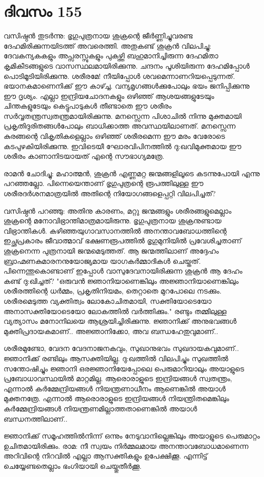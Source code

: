 \section{ദിവസം 155}


വസിഷ്ഠൻ തുടർന്നു: ഭൃഗുപുത്രനായ ശുക്രന്റെ ജീർണ്ണിച്ചുവരണ്ട ദേഹമിരിക്കുന്നയിടത്ത് അവരെത്തി. അതുകണ്ട് ശുക്രൻ വിലപിച്ചു: ദേവകന്യകകളും അപ്സരസ്സുകളും പുകഴ്ത്തി ബഹുമാനിച്ചിരുന്ന ദേഹമിതാ കൃമികീടങ്ങളുടെ വാസസ്ഥലമായിരിക്കുന്നു. ചന്ദനം പൂശിയിരുന്ന ദേഹമിപ്പോൾ പൊടിമൂടിയിരിക്കുന്നു. ശരീരമേ! നീയിപ്പോൾ ശവമെന്നാണറിയപ്പെടുന്നത്. ഭയാനകമാണെനിക്ക് ഈ കാഴ്ച്ച. വന്യമൃഗങ്ങൾക്കുപോലും ഭയം ജനിപ്പിക്കുന്നു ഈ ദൃശ്യം. എല്ലാ ഇന്ദ്രിയചോദനകളും ഒഴിഞ്ഞ് ആശയങ്ങളുടേയും ചിന്തകളുടേയും കെട്ടുപാടുകൾ തീണ്ടാതെ ഈ ശരീരം സർവ്വതന്ത്രസ്വതന്ത്രമായിരിക്കുന്നു. മനസ്സെന്ന പിശാചിൽ നിന്നു മുക്തമായി പ്രകൃതിദുരിതങ്ങൾപോലും ബാധിക്കാത്ത അവസ്ഥയിലാണത്. മനസ്സെന്ന കുരങ്ങന്റെ വികൃതികളെല്ലാം ഒഴിഞ്ഞ് ശരീരമെന്ന ഈ മരം വേരോടെ കടപുഴകിയിരിക്കുന്നു. ഇവിടെയീ ഘോരവിപിനത്തിൽ ദു:ഖവിമുക്തമായ ഈ ശരീരം കാണാനിടയായത് എന്റെ സൗഭാഗ്യമത്രേ.

രാമൻ ചോദിച്ചു: മഹാത്മൻ, ശുക്രൻ എണ്ണമറ്റ ജന്മങ്ങളിലൂടെ കടന്നുപോയി എന്നു പറഞ്ഞല്ലോ. പിന്നെയെന്താണ്‌ ഭൃഗുപുത്രന്റെ രൂപത്തിലുള്ള ഈ ശരീരദർശനമാത്രയിൽ അതിന്റെ നിയോഗങ്ങളെപ്പറ്റി വിലപിച്ചത്?

വസിഷ്ഠൻ പറഞ്ഞു: അതിനു കാരണം, മറ്റു ജന്മങ്ങളും ശരീരങ്ങളുമെല്ലാം ശുക്രന്റെ മനോവിഭ്രാന്തിമാത്രമായിരുന്നു. ഭൃഗുപുത്രനായ ശുക്രനുണ്ടായ വിഭ്രാന്തികൾ. കഴിഞ്ഞയുഗാവസാനത്തിൽ അനന്താവബോധത്തിന്റെ ഇച്ഛപ്രകാരം ജീവാത്മാവ് ഭക്ഷണരൂപത്തിൽ ഭൃഗുമുനിയിൽ പ്രവേശിച്ചതാണ്‌ ശുക്രനെന്ന പുത്രനായി ജന്മമെടുത്തത്. ആ ജന്മത്തിലാണ്‌ അദ്ദേഹം ബ്രാഹ്മണകുമാരനനുയോജ്യമായ യാഗകർമ്മാദികൾ ചെയ്തത്. പിന്നെന്തുകൊണ്ടാണ്‌ ഇപ്പോൾ വാസുദേവനായിരിക്കുന്ന ശുക്രൻ ആ ദേഹം കണ്ട് ദു:ഖിച്ചത്?   "ഒരുവൻ ജ്ഞാനിയാണെങ്കിലും അജ്ഞാനിയാണെങ്കിലും ശരീരത്തിന്റെ ധർമ്മം, പ്രകൃതിനിയമം, തെറ്റാതെ മുറപോലെ നടക്കും. ശരീരമെടുത്ത വ്യക്തിത്വം ലോകോചിതമായി, സക്തിയോടെയോ അനാസക്തിയോടെയോ ലോകത്തിൽ വർത്തിക്കും." രണ്ടും തമ്മിലുള്ള വ്യത്യാസം മനോനിലയെ ആശ്രയിച്ചിരിക്കുന്നു. ജ്ഞാനിക്ക് അനുഭവങ്ങൾ മുക്തിപ്രദായകമാണ്‌.. അജ്ഞാനിക്കോ, അവ ബന്ധഹേതുവുമാണ്‌..

ശരീരമുണ്ടോ, വേദന വേദനാജനകവും, സുഖാനുഭവം സുഖദായകവുമാണ്‌..  ജ്ഞാനിക്ക് രണ്ടിലും ആസക്തിയില്ല. ദു:ഖത്തിൽ വിലപിച്ചും സുഖത്തിൽ സന്തോഷിച്ചും ജ്ഞാനി ഒരജ്ഞാനിയേപ്പോലെ പെരുമാറിയാലും അയാളുടെ പ്രബോധാവസ്ഥയിൽ മാറ്റമില്ല. ആരൊരാളുടെ ഇന്ദ്രിയങ്ങൾ സ്വതന്ത്രം, എന്നാൽ കർമ്മേന്ദ്രിയങ്ങൾ നിയന്ത്രണാധീനം ആണെങ്കിൽ അയാൾ മുക്തനത്രേ. എന്നാൽ ആരൊരാളുടെ ഇന്ദ്രിയങ്ങൾ നിയന്ത്രിതമെങ്കിലും കർമ്മേന്ദ്രിയങ്ങൾ നിയന്ത്രണമില്ലാത്തതാണെങ്കിൽ അയാൾ ബന്ധനത്തിലാണ്‌..

ജ്ഞാനിക്ക് സമൂഹത്തിൽനിന്ന് ഒന്നും നേടുവാനില്ലെങ്കിലും അയാളുടെ പെരുമാറ്റം ഉചിതമായിരിക്കും. രാമ: നീ സ്വയം നിർമ്മലമായ അനന്താവബോധമാണെന്ന അറിവിന്റെ നിറവിൽ എല്ലാ ആസക്തികളും ഉപേക്ഷിക്കൂ.  എന്നിട്ട് ചെയ്യേണ്ടതെല്ലാം ഭംഗിയായി ചെയ്തുതീർക്കൂ. 


